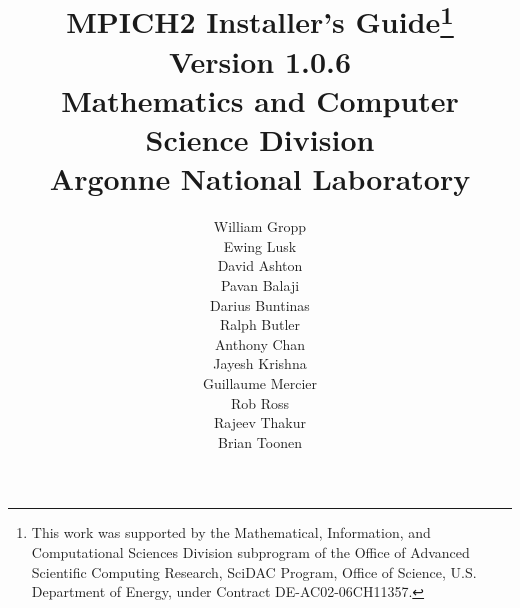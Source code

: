\documentclass[dvipdfm,11pt]{article}
\begin{document}
\title{{\bf MPICH2 Installer's Guide}\thanks{This work was supported by the
    Mathematical, Information, and Computational Sciences Division
    subprogram of the Office of Advanced Scientific Computing Research,
    SciDAC Program, Office of Science, U.S. Department of Energy, under
    Contract DE-AC02-06CH11357.}\\
  Version 1.0.6\\
  Mathematics and Computer Science Division\\
  Argonne National Laboratory}

\author{William Gropp\\
Ewing Lusk\\
David Ashton\\
Pavan Balaji\\
Darius Buntinas\\
Ralph Butler\\
Anthony Chan\\
Jayesh Krishna\\
Guillaume Mercier\\
Rob Ross\\
Rajeev Thakur\\
Brian Toonen}

\maketitle
\cleardoublepage

\tableofcontents
\clearpage

\pagestyle{headings}


\end{document}
